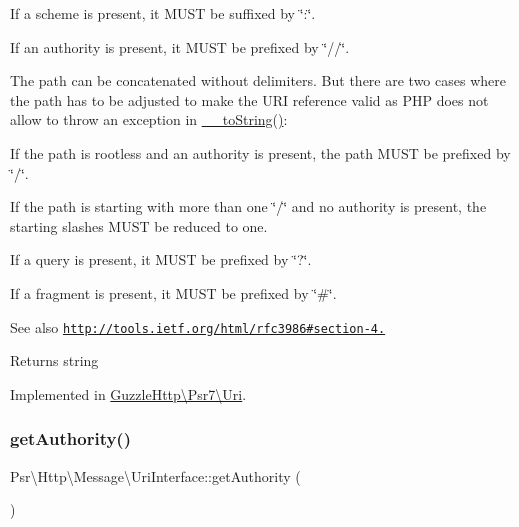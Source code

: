 \begin{DoxyItemize}
\item If a scheme is present, it M\+U\+ST be suffixed by \char`\"{}\+:\char`\"{}.
\item If an authority is present, it M\+U\+ST be prefixed by \char`\"{}//\char`\"{}.
\item The path can be concatenated without delimiters. But there are two cases where the path has to be adjusted to make the U\+RI reference valid as P\+HP does not allow to throw an exception in \hyperlink{interfacePsr_1_1Http_1_1Message_1_1UriInterface_a322566ef8139a72e4a3da1feffafb1e6}{\+\_\+\+\_\+to\+String()}\+:
\begin{DoxyItemize}
\item If the path is rootless and an authority is present, the path M\+U\+ST be prefixed by \char`\"{}/\char`\"{}.
\item If the path is starting with more than one \char`\"{}/\char`\"{} and no authority is present, the starting slashes M\+U\+ST be reduced to one.
\end{DoxyItemize}
\item If a query is present, it M\+U\+ST be prefixed by \char`\"{}?\char`\"{}.
\item If a fragment is present, it M\+U\+ST be prefixed by \char`\"{}\#\char`\"{}.
\end{DoxyItemize}

\begin{DoxySeeAlso}{See also}
\href{http://tools.ietf.org/html/rfc3986#section-4.1}{\tt http\+://tools.\+ietf.\+org/html/rfc3986\#section-\/4.} 
\end{DoxySeeAlso}
\begin{DoxyReturn}{Returns}
string 
\end{DoxyReturn}


Implemented in \hyperlink{classGuzzleHttp_1_1Psr7_1_1Uri_a98b6fcc3c3be3fb070fcb95fec762e7f}{Guzzle\+Http\textbackslash{}\+Psr7\textbackslash{}\+Uri}.

\mbox{\label{interfacePsr_1_1Http_1_1Message_1_1UriInterface_a2c32fd7d98677e1fb5d31d6d24ad937a}} 
\subsubsection{\texorpdfstring{get\+Authority()}{getAuthority()}}
{\footnotesize\ttfamily Psr\textbackslash{}\+Http\textbackslash{}\+Message\textbackslash{}\+Uri\+Interface\+::get\+Authority (\begin{DoxyParamCaption}{ }\end{DoxyParamCaption})}

